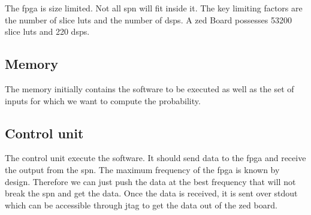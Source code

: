 The \gls{fpga} is size limited. Not all \gls{spn} will fit inside it. The key limiting factors are the number of slice \glspl{lut} and the number of \glspl{dsp}. A zed Board possesses 53200 slice \glspl{lut} and 220 \glspl{dsp}.

\subsection{Memory}
The memory initially contains the software to be executed as well as the set of inputs for which we want to compute the probability.

\subsection{Control unit}
The control unit execute the software. It should send data to the \gls{fpga} and receive the output from the \gls{spn}. The maximum frequency of the \gls{fpga} is known by design. Therefore we can just push the data at the best frequency that will not break the \gls{spn} and get the data. Once the data is received, it is sent over stdout which can be accessible through \gls{jtag} to get the data out of the zed board.




